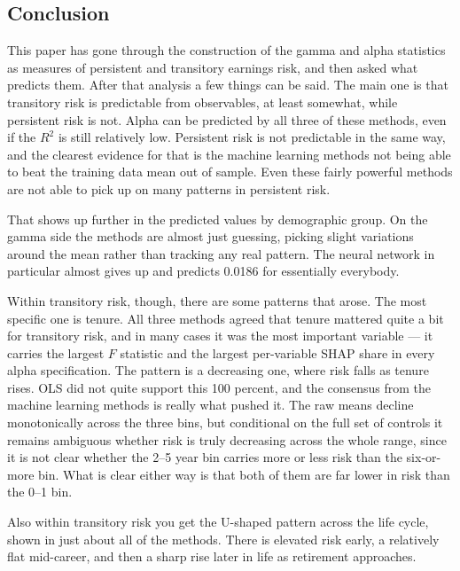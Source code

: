 \documentclass[12pt]{article}
\begin{document}
\begin{onehalfspace}
\section{Conclusion}

This paper has gone through the construction of the gamma and alpha statistics as measures of persistent and transitory earnings risk, and then asked what predicts them. After that analysis a few things can be said. The main one is that transitory risk is predictable from observables, at least somewhat, while persistent risk is not. Alpha can be predicted by all three of these methods, even if the $R^2$ is still relatively low. Persistent risk is not predictable in the same way, and the clearest evidence for that is the machine learning methods not being able to beat the training data mean out of sample. Even these fairly powerful methods are not able to pick up on many patterns in persistent risk.

That shows up further in the predicted values by demographic group. On the gamma side the methods are almost just guessing, picking slight variations around the mean rather than tracking any real pattern. The neural network in particular almost gives up and predicts 0.0186 for essentially everybody.

Within transitory risk, though, there are some patterns that arose. The most specific one is tenure. All three methods agreed that tenure mattered quite a bit for transitory risk, and in many cases it was the most important variable --- it carries the largest $F$ statistic and the largest per-variable SHAP share in every alpha specification. The pattern is a decreasing one, where risk falls as tenure rises. OLS did not quite support this 100 percent, and the consensus from the machine learning methods is really what pushed it. The raw means decline monotonically across the three bins, but conditional on the full set of controls it remains ambiguous whether risk is truly decreasing across the whole range, since it is not clear whether the 2--5 year bin carries more or less risk than the six-or-more bin. What is clear either way is that both of them are far lower in risk than the 0--1 bin.

Also within transitory risk you get the U-shaped pattern across the life cycle, shown in just about all of the methods. There is elevated risk early, a relatively flat mid-career, and then a sharp rise later in life as retirement approaches.


\end{onehalfspace}
\end{document}
